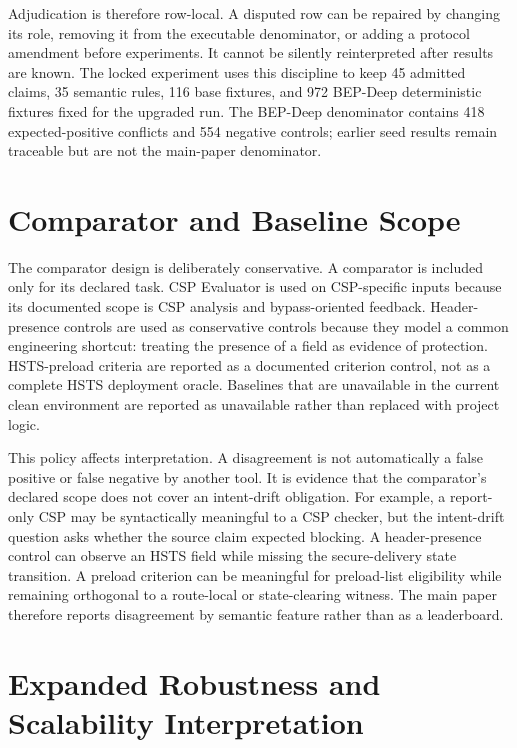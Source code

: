 \documentclass[10pt,conference]{IEEEtran}
\begin{document}
Adjudication is therefore row-local. A disputed row can be repaired by changing its role, removing it from the executable denominator, or adding a protocol amendment before experiments. It cannot be silently reinterpreted after results are known. The locked experiment uses this discipline to keep 45 admitted claims, 35 semantic rules, 116 base fixtures, and 972 BEP-Deep deterministic fixtures fixed for the upgraded run. The BEP-Deep denominator contains 418 expected-positive conflicts and 554 negative controls; earlier seed results remain traceable but are not the main-paper denominator.

\section{Comparator and Baseline Scope}

The comparator design is deliberately conservative. A comparator is included only for its declared task. CSP Evaluator is used on CSP-specific inputs because its documented scope is CSP analysis and bypass-oriented feedback. Header-presence controls are used as conservative controls because they model a common engineering shortcut: treating the presence of a field as evidence of protection. HSTS-preload criteria are reported as a documented criterion control, not as a complete HSTS deployment oracle. Baselines that are unavailable in the current clean environment are reported as unavailable rather than replaced with project logic.

This policy affects interpretation. A disagreement is not automatically a false positive or false negative by another tool. It is evidence that the comparator's declared scope does not cover an intent-drift obligation. For example, a report-only CSP may be syntactically meaningful to a CSP checker, but the intent-drift question asks whether the source claim expected blocking. A header-presence control can observe an HSTS field while missing the secure-delivery state transition. A preload criterion can be meaningful for preload-list eligibility while remaining orthogonal to a route-local or state-clearing witness. The main paper therefore reports disagreement by semantic feature rather than as a leaderboard.

\section{Expanded Robustness and Scalability Interpretation}
\end{document}
